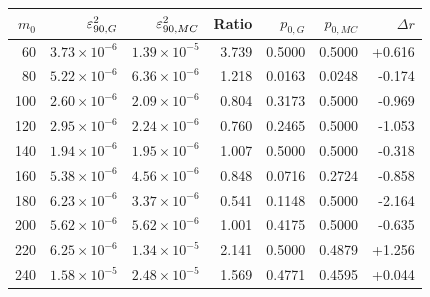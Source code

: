 \begin{tabular}{rrrrrrr}
\toprule
$m_0$ & $\varepsilon^2_{90,G}$ & $\varepsilon^2_{90,MC}$ & Ratio & $p_{0,G}$ & $p_{0,MC}$ & $\Delta r$ \\
\midrule
60 & $3.73\times10^{-6}$ & $1.39\times10^{-5}$ & 3.739 & 0.5000 & 0.5000 & +0.616 \\
80 & $5.22\times10^{-6}$ & $6.36\times10^{-6}$ & 1.218 & 0.0163 & 0.0248 & -0.174 \\
100 & $2.60\times10^{-6}$ & $2.09\times10^{-6}$ & 0.804 & 0.3173 & 0.5000 & -0.969 \\
120 & $2.95\times10^{-6}$ & $2.24\times10^{-6}$ & 0.760 & 0.2465 & 0.5000 & -1.053 \\
140 & $1.94\times10^{-6}$ & $1.95\times10^{-6}$ & 1.007 & 0.5000 & 0.5000 & -0.318 \\
160 & $5.38\times10^{-6}$ & $4.56\times10^{-6}$ & 0.848 & 0.0716 & 0.2724 & -0.858 \\
180 & $6.23\times10^{-6}$ & $3.37\times10^{-6}$ & 0.541 & 0.1148 & 0.5000 & -2.164 \\
200 & $5.62\times10^{-6}$ & $5.62\times10^{-6}$ & 1.001 & 0.4175 & 0.5000 & -0.635 \\
220 & $6.25\times10^{-6}$ & $1.34\times10^{-5}$ & 2.141 & 0.5000 & 0.4879 & +1.256 \\
240 & $1.58\times10^{-5}$ & $2.48\times10^{-5}$ & 1.569 & 0.4771 & 0.4595 & +0.044 \\
\bottomrule
\end{tabular}
